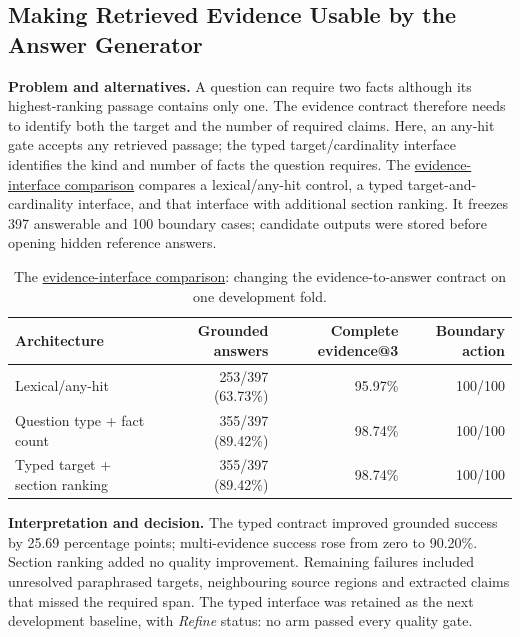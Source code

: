 \subsection{Making Retrieved Evidence Usable by the Answer Generator}
\label{sec:grounding-comparison}
\textbf{Problem and alternatives.}
A question can require two facts although its highest-ranking passage contains
only one. The evidence contract therefore needs to identify both the target
and the number of required claims. Here, an any-hit gate accepts any retrieved
passage; the typed target/cardinality interface identifies the kind and number
of facts the question requires. The \hyperref[study-A]{evidence-interface comparison} compares a lexical/any-hit control,
a typed target-and-cardinality interface, and that interface with additional
section ranking. It freezes 397 answerable and 100 boundary cases; candidate
outputs were stored before opening hidden reference answers.

\begin{table}[htbp]
\centering\small
\caption{The \hyperref[study-A]{evidence-interface comparison}: changing the evidence-to-answer contract on one development fold.}
\label{tab:evidence-interface}
\begin{tabularx}{\linewidth}{@{}Yrrr@{}}
\toprule Architecture & Grounded answers & Complete evidence@3 & Boundary action \\\midrule
Lexical/any-hit & 253/397 (63.73\%) & 95.97\% & 100/100 \\
Question type + fact count & 355/397 (89.42\%) & 98.74\% & 100/100 \\
Typed target + section ranking & 355/397 (89.42\%) & 98.74\% & 100/100 \\
\bottomrule
\end{tabularx}
\end{table}

\textbf{Interpretation and decision.}
The typed contract improved grounded success by 25.69 percentage points;
multi-evidence success rose from zero to 90.20\%. Section ranking added no
quality improvement. Remaining failures included unresolved paraphrased targets,
neighbouring source regions and extracted claims that missed the required span.
The typed interface was retained as the next development baseline, with
\emph{Refine} status: no arm passed every quality gate. 

